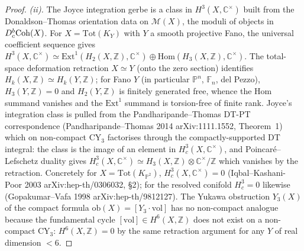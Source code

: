 \begin{proof}
\emph{(ii).} The Joyce integration gerbe is a class in
$H^3(X, \mathbb C^\times)$ built from the Donaldson--Thomas
orientation data on $\mathcal M(X)$, the moduli of objects in
$D^b_c\mathrm{Coh}(X)$. For $X = \mathrm{Tot}(K_Y)$ with $Y$ a smooth
projective Fano, the universal coefficient sequence gives
$H^3(X, \mathbb C^\times) \simeq
\mathrm{Ext}^1(H_2(X, \mathbb Z), \mathbb C^\times)
\oplus \mathrm{Hom}(H_3(X, \mathbb Z), \mathbb C^\times)$.
The total-space deformation retraction $X \simeq Y$ (onto the
zero section) identifies $H_k(X, \mathbb Z) \simeq H_k(Y, \mathbb Z)$;
for Fano $Y$ (in particular $\mathbb P^n$, $\mathbb F_n$, del
Pezzo), $H_3(Y, \mathbb Z) = 0$ and $H_2(Y, \mathbb Z)$ is
finitely generated free, whence the $\mathrm{Hom}$ summand
vanishes and the $\mathrm{Ext}^1$ summand is torsion-free of
finite rank. Joyce's integration class is pulled from the
Pandharipande--Thomas DT-PT correspondence (Pandharipande--Thomas
2014 arXiv:1111.1552, Theorem~1) which on non-compact CY$_3$
factorises through the compactly-supported DT integral: the
class is the image of an element in $H^3_c(X, \mathbb C^\times)$,
and Poincar\'e--Lefschetz duality gives
$H^3_c(X, \mathbb C^\times) \simeq H_3(X, \mathbb Z) \otimes
\mathbb C^\times / \mathbb Z$ which vanishes by the retraction.
Concretely for $X = \mathrm{Tot}(K_{\mathbb P^2})$, $H^3_c(X, \mathbb C^\times) = 0$
(Iqbal--Kashani-Poor 2003 arXiv:hep-th/0306032, \S 2); for the
resolved conifold $H^3_c = 0$ likewise (Gopakumar--Vafa 1998
arXiv:hep-th/9812127). The Yukawa obstruction $Y_3(X)$ of the
compact formula $\mathrm{ob}(X) = [Y_3 \cdot \mathrm{vol}]$ has
no non-compact analogue because the fundamental cycle
$[\mathrm{vol}] \in H^6(X, \mathbb Z)$ does not exist on a
non-compact CY$_3$: $H^6(X, \mathbb Z) = 0$ by the same
retraction argument for any $Y$ of real dimension $< 6$.


\end{proof}
